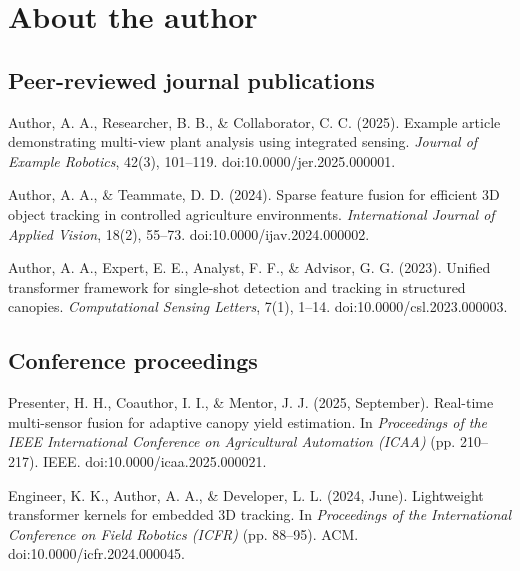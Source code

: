 \chapter{About the author}
\lipsum[1-2]

\section*{Peer-reviewed journal publications}

Author, A. A., Researcher, B. B., & Collaborator, C. C. (2025). Example article demonstrating multi-view plant analysis using integrated sensing. \textit{Journal of Example Robotics}, 42(3), 101–119. doi:10.0000/jer.2025.000001.

Author, A. A., & Teammate, D. D. (2024). Sparse feature fusion for efficient 3D object tracking in controlled agriculture environments. \textit{International Journal of Applied Vision}, 18(2), 55–73. doi:10.0000/ijav.2024.000002.

Author, A. A., Expert, E. E., Analyst, F. F., & Advisor, G. G. (2023). Unified transformer framework for single-shot detection and tracking in structured canopies. \textit{Computational Sensing Letters}, 7(1), 1–14. doi:10.0000/csl.2023.000003.

\section*{Conference proceedings}

Presenter, H. H., Coauthor, I. I., & Mentor, J. J. (2025, September). Real-time multi-sensor fusion for adaptive canopy yield estimation. In \textit{Proceedings of the IEEE International Conference on Agricultural Automation (ICAA)} (pp. 210–217). IEEE. doi:10.0000/icaa.2025.000021.

Engineer, K. K., Author, A. A., & Developer, L. L. (2024, June). Lightweight transformer kernels for embedded 3D tracking. In \textit{Proceedings of the International Conference on Field Robotics (ICFR)} (pp. 88–95). ACM. doi:10.0000/icfr.2024.000045.


